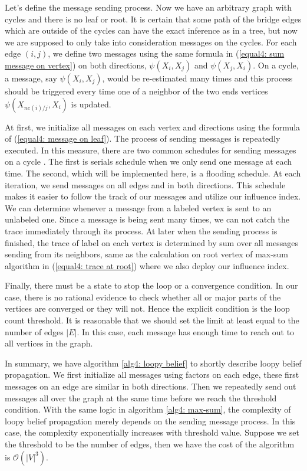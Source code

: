 Let's define the message sending process. Now we have an arbitrary graph with cycles and there is no leaf or root. It is certain that some path of the bridge edges which are outside of the cycles can have the exact inference as in a tree, but now we are supposed to only take into consideration messages on the cycles. For each edge $(i,j)$, we define two messages using the same formula in (\ref{equal4: sum message on vertex}) on both directions, $\psi(X_i, X_j)$ and $\psi(X_j, X_i)$. On a cycle, a message, say $\psi(X_i, X_j)$, would be re-estimated many times and this process should be triggered every time one of a neighbor of the two ends vertices $\psi(X_{ne(i)/j}, X_i)$ is updated.

At first, we initialize all messages on each vertex and directions using the formula of (\ref{equal4: message on leaf}). The process of sending messages is repeatedly executed. In this measure, there are two common schedules for sending messages on a cycle \parencite{bishop2006pattern}. The first is serials schedule when we only send one message at each time. The second, which will be implemented here, is a flooding schedule. At each iteration, we send messages on all edges and in both directions. This schedule makes it easier to follow the track of our messages and utilize our influence index. We can determine whenever a message from a labeled vertex is sent to an unlabeled one. Since a message is being sent many times, we can not catch the trace immediately through its process. At later when the sending process is finished, the trace of label on each vertex is determined by sum over all messages sending from its neighbors, same as the calculation on root vertex of max-sum algorithm in (\ref{equal4: trace at root}) where we also deploy our influence index.

Finally, there must be a state to stop the loop or a convergence condition. In our case, there is no rational evidence to check whether all or major parts of the vertices are converged or they will not. Hence the explicit condition is the loop count threshold. It is reasonable that we should set the limit at least equal to the number of edges $|E|$. In this case, each message has enough time to reach out to all vertices in the graph. 

In summary, we have algorithm \ref{alg4: loopy belief} to shortly describe loopy belief propagation. We first initialize all messages using factors on each edge, these first messages on an edge are similar in both directions. Then we repeatedly send out messages all over the graph at the same time before we reach the threshold condition. With the same logic in algorithm \ref{alg4: max-sum}, the complexity of loopy belief propagation merely depends on the sending message process. In this case, the complexity exponentially increases with threshold value. Suppose we set the threshold to be the number of edges, then we have the cost of the algorithm is $\mathcal{O}(|V|^3)$. 

